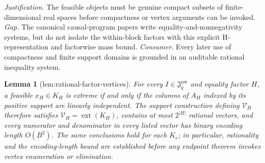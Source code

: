 \documentclass{article}
\newtheorem{lemma}{Lemma}
\begin{document}
\par\smallskip\noindent \textit{Justification.} The feasible objects must be genuine compact subsets of finite-dimensional real spaces before compactness or vertex arguments can be invoked. \textit{Gap.} The canonical causal-program papers write equality-and-nonnegativity systems, but do not isolate the within-block factors with this explicit H-representation and factorwise mass bound. \textit{Consumer.} Every later use of compactness and finite support domains is grounded in an auditable rational inequality system.

\begin{lemma}[lem:rational-factor-vertices]\label{lem:rational-factor-vertices}
For every \(I\in\mathfrak J_q^{\mathrm{nw}}\) and equality factor \(H\), a feasible \(x_H\in K_H\) is extreme if and only if the columns of \(A_H\) indexed by its positive support are linearly independent. The support construction defining \(\mathcal V_H\) therefore satisfies \(\mathcal V_H=\operatorname{ext}(K_H)\), contains at most \(2^{|H|}\) rational vectors, and every numerator and denominator in every listed vector has binary encoding length \(O(B^2)\). The same conclusions hold for each \(K_c\); in particular, rationality and the encoding-length bound are established before any endpoint theorem invokes vertex enumeration or elimination.
\end{lemma}
\end{document}
